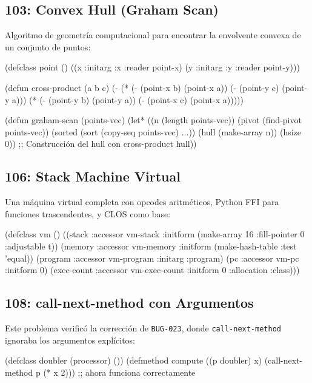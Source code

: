 \subsection*{103: Convex Hull (Graham Scan)}

Algoritmo de geometría computacional para encontrar la envolvente convexa
de un conjunto de puntos:

\begin{lispcode}
(defclass point ()
  ((x :initarg :x :reader point-x)
   (y :initarg :y :reader point-y)))

(defun cross-product (a b c)
  (- (* (- (point-x b) (point-x a))
        (- (point-y c) (point-y a)))
     (* (- (point-y b) (point-y a))
        (- (point-x c) (point-x a)))))

(defun graham-scan (points-vec)
  (let* ((n (length points-vec))
         (pivot (find-pivot points-vec))
         (sorted (sort (copy-seq points-vec) ...))
         (hull (make-array n)) (hsize 0))
    ;; Construcción del hull con cross-product
    hull))
\end{lispcode}

\subsection*{106: Stack Machine Virtual}

Una máquina virtual completa con opcodes aritméticos, Python FFI para
funciones trascendentes, y CLOS como base:

\begin{lispcode}
(defclass vm ()
  ((stack :accessor vm-stack
          :initform (make-array 16 :fill-pointer 0 :adjustable t))
   (memory :accessor vm-memory :initform (make-hash-table :test 'equal))
   (program :accessor vm-program :initarg :program)
   (pc :accessor vm-pc :initform 0)
   (exec-count :accessor vm-exec-count :initform 0 :allocation :class)))
\end{lispcode}

\subsection*{108: call-next-method con Argumentos}

Este problema verificó la corrección de \texttt{BUG-023}, donde
\texttt{call-next-method} ignoraba los argumentos explícitos:

\begin{lispcode}
(defclass doubler (processor) ())
(defmethod compute ((p doubler) x)
  (call-next-method p (* x 2)))  ;; ahora funciona correctamente
\end{lispcode}

